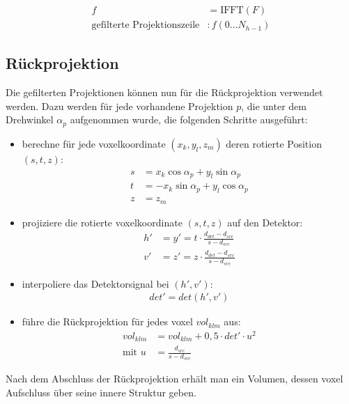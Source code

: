 \begin{equation}
    \begin{aligned}
        f &= \text{IFFT}(F)\\
        \text{gefilterte Projektionszeile} &: f(0 \dots N_{h - 1})
    \end{aligned}
\end{equation}

\subsection{Rückprojektion}\label{sssec:backprojection}

Die gefilterten Projektionen können nun für die Rückprojektion verwendet werden. Dazu werden für jede vorhandene
Projektion $p$, die unter dem Drehwinkel $\alpha_p$ aufgenommen wurde, die folgenden Schritte ausgeführt:

\begin{itemize}
    \item berechne für jede \gls{voxel}koordinate $(x_k, y_l, z_m)$ deren rotierte Position $(s, t, z)$:
        \begin{equation}
            \begin{aligned}
                s &= x_k \cos \alpha_p + y_l \sin \alpha_p\\
                t &= -x_k \sin \alpha_p + y_l \cos \alpha_p\\
                z &= z_m
            \end{aligned}
        \end{equation}

    \item projiziere die rotierte \gls{voxel}koordinate $(s, t, z)$ auf den Detektor:
        \begin{equation}
            \begin{aligned}
                h' &= y' = t \cdot \frac{d_{det} - d_{src}}{s - d_{src}}\\
                v' &= z' = z \cdot \frac{d_{det} - d_{src}}{s - d_{src}}
            \end{aligned}
        \end{equation}

    \item interpoliere das Detektorsignal bei $(h', v')$:
        \begin{equation}
            \begin{aligned}
                det' = det(h', v')
            \end{aligned}
        \end{equation}

    \item führe die Rückprojektion für jedes \gls{voxel} $vol_{klm}$ aus:
        \begin{equation}
            \begin{aligned}
                vol_{klm} &= vol_{klm} + 0,5 \cdot det' \cdot u^2\\
                \text{mit } u &= \frac{d_{src}}{s - d_{src}}
            \end{aligned}
        \end{equation}
\end{itemize}

Nach dem Abschluss der Rückprojektion erhält man ein Volumen, dessen \gls{voxel} Aufschluss über seine innere Struktur
geben.

